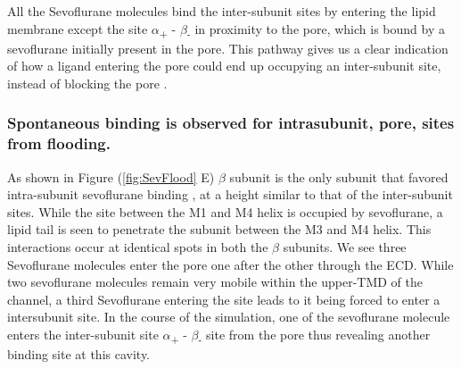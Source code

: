 \documentclass{biophys}
\begin{document}
All the Sevoflurane molecules bind the inter-subunit sites by entering the lipid membrane except the site  $\alpha$\textsubscript{+} - $\beta$\textsubscript{-} in proximity to the pore, which is bound by a sevoflurane initially present in the pore. This pathway gives us a clear indication of how a ligand entering the pore could end up occupying an inter-subunit site, instead of blocking the pore \citep{Adodra1995}.


\subsubsection{Spontaneous binding is observed for intrasubunit, pore, sites from flooding.}
 As shown in Figure (\ref{fig:SevFlood} E) $\beta$ subunit is the only subunit that favored intra-subunit sevoflurane binding , at a height similar to that of the inter-subunit sites. While the site between the M1 and M4 helix is occupied by sevoflurane, a lipid tail is seen to penetrate the subunit between the M3 and M4 helix. This interactions occur at identical spots in both the $\beta$ subunits. 
We see three Sevoflurane molecules enter the pore one after the other through the ECD. While two sevoflurane molecules remain very mobile within the upper-TMD of the channel, a third Sevoflurane entering the site leads to it being forced to enter a intersubunit site. In the course of the simulation, one of the sevoflurane molecule enters the inter-subunit site $\alpha$\textsubscript{+} - $\beta$\textsubscript{-} site from the pore thus revealing another binding site at this cavity. 

\end{document}
